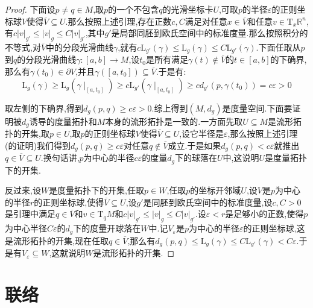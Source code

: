 \begin{enumerate}
\begin{proof}
		\qquad
		
		下面设$p\not=q\in M$,取$p$的一个不包含$q$的光滑坐标卡$U$,可取$p$的半径$\varepsilon$的正则坐标球$V$使得$\overline{V}\subseteq U$.那么按照上述引理,存在正数$c,C$满足对任意$x\in\overline{V}$和任意$v\in\mathrm{T}_x\mathbb{R}^n$,有$c|v|_{g'}\le|v|_g\le C|v|_{g'}$,其中$g'$是局部同胚到欧氏空间中的标准度量.那么按照积分的不等式,对$\overline{V}$中的分段光滑曲线$\gamma$,就有$c\mathrm{L}_{g'}(\gamma)\le\mathrm{L}_g(\gamma)\le C\mathrm{L}_{g'}(\gamma)$.下面任取从$p$到$q$的分段光滑曲线$\gamma:[a,b]\to M$,设$t_0$是所有满足$\gamma(t)\not\in\overline{V}$的$t\in[a,b]$的下确界,那么有$\gamma(t_0)\in\partial V$,并且$\gamma([a,t_0])\subseteq\overline{V}$.于是有:
		$$\mathrm{L}_g(\gamma)\ge\mathrm{L}_g(\gamma\mid_{[a,t_0]})\ge c\mathrm{L}_{g'}(\gamma\mid_{[a,t_0]})\ge cd_{g'}(p,\gamma(t_0))=c\varepsilon>0$$
		
		取左侧的下确界,得到$d_g(p,q)\ge c\varepsilon>0$.综上得到$(M,d_g)$是度量空间.下面要证明被$d_g$诱导的度量拓扑和$M$本身的流形拓扑是一致的.一方面先取$U\subseteq M$是流形拓扑的开集,取$p\in U$,取$p$的正则坐标球$V$使得$\overline{V}\subseteq U$,设它半径是$\varepsilon$,那么按照上述引理(的证明)我们得到$d_g(p,q)\ge c\varepsilon$对任意$q\not\in\overline{V}$成立.于是如果$d_g(p,q)<c\varepsilon$就推出$q\in\overline{V}\subseteq U$.换句话讲,$p$为中心的半径$c\varepsilon$的度量$d_g$下的球落在$U$中,这说明$U$是度量拓扑下的开集.
		
		\qquad
		
		反过来,设$W$是度量拓扑下的开集,任取$p\in W$,任取$p$的坐标开邻域$U$,设$V$是$p$为中心的半径$r$的正则坐标球,使得$\overline{V}\subseteq U$,设$g'$是同胚到欧氏空间中的标准度量,设$c,C>0$是引理中满足$q\in\overline{V}$和$v\in\mathrm{T}_qM$和$c|v|_{g'}\le|v|_g\le C|v|_{g'}$.设$\varepsilon<r$是足够小的正数,使得$p$为中心半径$C\varepsilon$的$d_g$下的度量开球落在$W$中.记$V_{\varepsilon}$是$p$为中心的半径$\varepsilon$的正则坐标球,这是流形拓扑的开集,现在任取$q\in\overline{V}$,那么有$d_g(p,q)\le\mathrm{L}_g(\gamma)\le C\mathrm{L}_{g'}(\gamma)<C\varepsilon$.于是有$V_{\varepsilon}\subseteq W$,这就说明$W$是流形拓扑的开集.
	\end{proof}
\end{enumerate}
\newpage
\section{联络}

